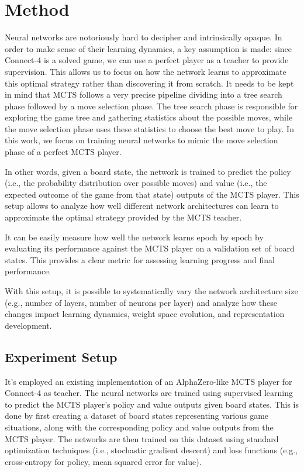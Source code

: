 \documentclass[tikz,12pt,a4paper]{article}
\theoremstyle{definition}
\begin{document}
\section{Method}
Neural networks are notoriously hard to decipher and intrinsically opaque. In order to make sense of their learning dynamics, a key assumption is made: since Connect-4 is a solved game, we can use a perfect player as a teacher to provide supervision. This allows us to focus on how the network learns to approximate this optimal strategy rather than discovering it from scratch.
It needs to be kept in mind that MCTS follows a very precise pipeline dividing into a tree search phase followed by a move selection phase. The tree search phase is responsible for exploring the game tree and gathering statistics about the possible moves, while the move selection phase uses these statistics to choose the best move to play. In this work, we focus on training neural networks to mimic the move selection phase of a perfect MCTS player.

In other words, given a board state, the network is trained to predict the policy (i.e., the probability distribution over possible moves) and value (i.e., the expected outcome of the game from that state) outputs of the MCTS player. This setup allows to analyze how well different network architectures can learn to approximate the optimal strategy provided by the MCTS teacher.

It can be easily measure how well the network learns epoch by epoch by evaluating its performance against the MCTS player on a validation set of board states. This provides a clear metric for assessing learning progress and final performance.

With this setup, it is possible to systematically vary the network architecture size (e.g., number of layers, number of neurons per layer) and analyze how these changes impact learning dynamics, weight space evolution, and representation development.

\subsection{Experiment Setup}
It's employed an existing implementation of an AlphaZero-like MCTS player for Connect-4 as teacher. The neural networks are trained using supervised learning to predict the MCTS player's policy and value outputs given board states. 
This is done by first creating a dataset of board states representing various game situations, along with the corresponding policy and value outputs from the MCTS player. The networks are then trained on this dataset using standard optimization techniques (i.e., stochastic gradient descent) and loss functions (e.g., cross-entropy for policy, mean squared error for value).
\end{document}
